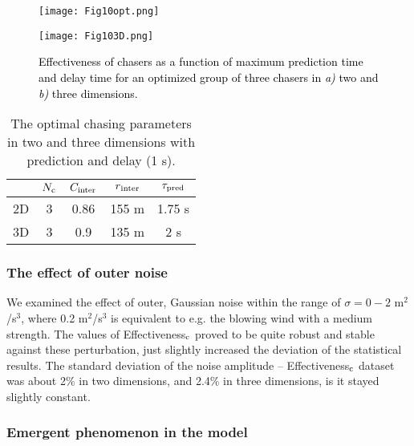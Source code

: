 \documentclass[12pt,a4paper,final]{iopart}
\newcommand{\revision}{\textcolor{black}}
\begin{document}
\begin{figure}[h]
\begin{minipage}[c]{0.57\textwidth}
\hspace{-1cm}
\texttt{[image: Fig10opt.png]}
\end{minipage}
\begin{minipage}[c]{0.57\textwidth}
\hspace{-1cm}
\texttt{[image: Fig103D.png]}
\end{minipage}
\label{fig:Fig11}
\caption{\revision{Effectiveness of chasers as a function of maximum prediction time and delay time for an optimized group of three chasers in {\it a)} two and {\it b)} three dimensions.}}
\end{figure}

\begin{table}
\centering
\label{table:oop2}
\begin{tabular}{@{}l|cccc@{}}
& $N_{\rm c}$ & $C_{\rm inter}$ & $\revision{r}_{\rm inter}$ & $\tau_{\rm pred}$ \\ 
\hline
2D & 3 & 0.86 & 155 m & 1.75 s \\
3D & 3 & 0.9 & 135 m & 2 s \\ 
\end{tabular}
\caption{The optimal chasing parameters in two and three dimensions with prediction and delay (1 s).}
\end{table}


\subsubsection{The effect of outer noise}

We examined the effect of outer, Gaussian noise within the range of $\sigma = 0 - 2$ m$^2$/s$^3$, where 0.2 m$^2$/s$^3$ is equivalent to e.g. the blowing wind with a medium strength. The values of Effectiveness$_{\rm c}$ proved to be quite robust and  stable against these perturbation, just slightly increased the deviation of the statistical results. The standard deviation of the noise amplitude  --  Effectiveness$_{\rm c}$ dataset was about 2\% in two dimensions, and 2.4\% in three dimensions, is it stayed slightly constant. 


\subsubsection{Emergent phenomenon in the model}
\end{document}

